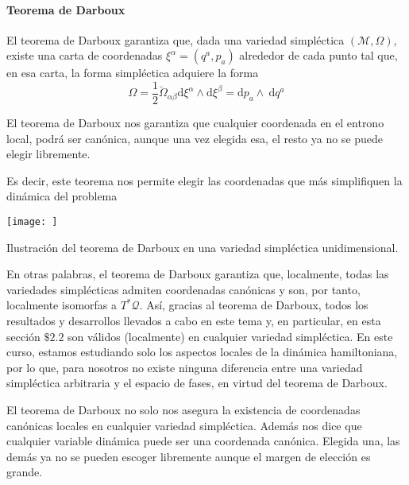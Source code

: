 \paragraph{Teorema de Darboux}
El teorema de Darboux garantiza que, dada una variedad simpléctica $(\mathscr{M}, \Omega)$, existe una carta de coordenadas $\xi^{\alpha}=\left(q^{a}, p_{a}\right)$ alrededor de cada punto tal que, en esa carta, la forma simpléctica adquiere la forma
$$
\Omega=\frac{1}{2} \breve{\Omega}_{\alpha \beta} \mathrm{d} \xi^{\alpha} \wedge \mathrm{d} \xi^{\beta}=\mathrm{d} p_{a} \wedge \mathrm{~d} q^{a}
$$
\begin{theorem}
  El teorema de Darboux nos garantiza que cualquier coordenada en el entrono local, podrá ser canónica, aunque una vez elegida esa, el resto ya no se puede elegir libremente.

  Es decir, este teorema nos permite elegir las coordenadas que más simplifiquen la dinámica del problema
\end{theorem}
\begin{marginfigure}[]
  \texttt{[image: ]}
  \caption[]{Ilustración del teorema de Darboux en una variedad simpléctica unidimensional.}
\end{marginfigure}
En otras palabras, el teorema de Darboux garantiza que, localmente, todas las variedades simplécticas admiten coordenadas canónicas y son, por tanto, localmente isomorfas a $T^{*} \mathscr{Q}$. Así, gracias al teorema de Darboux, todos los resultados y desarrollos llevados a cabo en este tema y, en particular, en esta sección $\$ 2.2$ son válidos (localmente) en cualquier variedad simpléctica. En este curso, estamos estudiando solo los aspectos locales de la dinámica hamiltoniana, por lo que, para nosotros no existe ninguna diferencia entre una variedad simpléctica arbitraria y el espacio de fases, en virtud del teorema de Darboux.

El teorema de Darboux no solo nos asegura la existencia de coordenadas canónicas locales en cualquier variedad simpléctica. Además nos dice que cualquier variable dinámica puede ser una coordenada canónica. Elegida una, las demás ya no se pueden escoger libremente aunque el margen de elección es grande.

